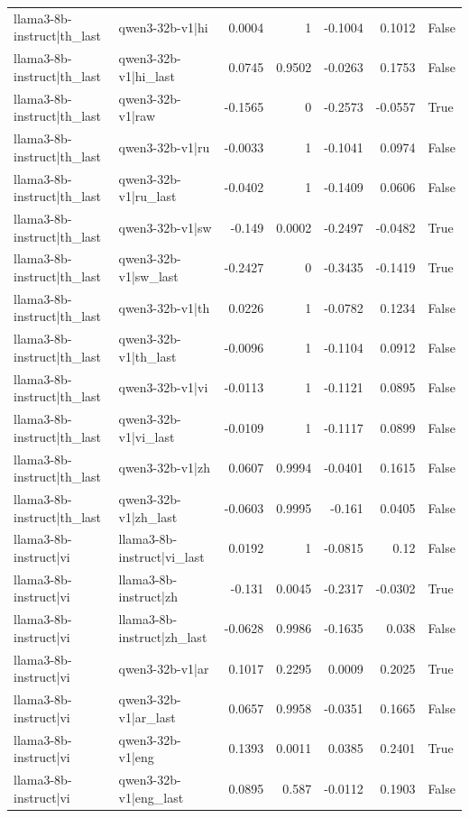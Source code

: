 \begin{table}
\begin{tabular}{l l r r r r l}
llama3-8b-instruct|th_last & qwen3-32b-v1|hi & 0.0004 & 1 & -0.1004 & 0.1012 & False \\
llama3-8b-instruct|th_last & qwen3-32b-v1|hi_last & 0.0745 & 0.9502 & -0.0263 & 0.1753 & False \\
llama3-8b-instruct|th_last & qwen3-32b-v1|raw & -0.1565 & 0 & -0.2573 & -0.0557 & True \\
llama3-8b-instruct|th_last & qwen3-32b-v1|ru & -0.0033 & 1 & -0.1041 & 0.0974 & False \\
llama3-8b-instruct|th_last & qwen3-32b-v1|ru_last & -0.0402 & 1 & -0.1409 & 0.0606 & False \\
llama3-8b-instruct|th_last & qwen3-32b-v1|sw & -0.149 & 0.0002 & -0.2497 & -0.0482 & True \\
llama3-8b-instruct|th_last & qwen3-32b-v1|sw_last & -0.2427 & 0 & -0.3435 & -0.1419 & True \\
llama3-8b-instruct|th_last & qwen3-32b-v1|th & 0.0226 & 1 & -0.0782 & 0.1234 & False \\
llama3-8b-instruct|th_last & qwen3-32b-v1|th_last & -0.0096 & 1 & -0.1104 & 0.0912 & False \\
llama3-8b-instruct|th_last & qwen3-32b-v1|vi & -0.0113 & 1 & -0.1121 & 0.0895 & False \\
llama3-8b-instruct|th_last & qwen3-32b-v1|vi_last & -0.0109 & 1 & -0.1117 & 0.0899 & False \\
llama3-8b-instruct|th_last & qwen3-32b-v1|zh & 0.0607 & 0.9994 & -0.0401 & 0.1615 & False \\
llama3-8b-instruct|th_last & qwen3-32b-v1|zh_last & -0.0603 & 0.9995 & -0.161 & 0.0405 & False \\
llama3-8b-instruct|vi & llama3-8b-instruct|vi_last & 0.0192 & 1 & -0.0815 & 0.12 & False \\
llama3-8b-instruct|vi & llama3-8b-instruct|zh & -0.131 & 0.0045 & -0.2317 & -0.0302 & True \\
llama3-8b-instruct|vi & llama3-8b-instruct|zh_last & -0.0628 & 0.9986 & -0.1635 & 0.038 & False \\
llama3-8b-instruct|vi & qwen3-32b-v1|ar & 0.1017 & 0.2295 & 0.0009 & 0.2025 & True \\
llama3-8b-instruct|vi & qwen3-32b-v1|ar_last & 0.0657 & 0.9958 & -0.0351 & 0.1665 & False \\
llama3-8b-instruct|vi & qwen3-32b-v1|eng & 0.1393 & 0.0011 & 0.0385 & 0.2401 & True \\
llama3-8b-instruct|vi & qwen3-32b-v1|eng_last & 0.0895 & 0.587 & -0.0112 & 0.1903 & False \\

\end{tabular}
\end{table}
